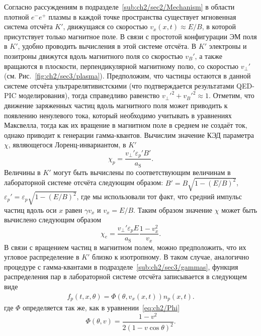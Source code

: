 Согласно рассуждениям в подразделе~\ref{sub:ch2/sec2/Mechanism} в области плотной $e^-e^+$ плазмы в каждой точке пространства существует мгновенная система отсчёта $K'$, движущаяся со скоростью $v_x(x,t)\approx E/B$, в которой присутствует только магнитное поле.
В связи с простотой конфигурации ЭМ поля в $K'$, удобно проводить вычисления в этой системе отсчёта.
В $K'$ электроны и позитроны движутся вдоль магнитного поля со скоростью $v_B'$, а также вращаются в плоскости, перпендикулярной магнитному полю, со скоростью $v_\perp'$ (см. Рис.~\ref{fig:ch2/sec3/plasma}). 
Предположим, что частицы остаются в данной системе отсчёта ультрарелятивистскими (что подтверждается результатами QED-PIC моделирования), тогда справедливо равенство ${v_\perp'}^2+{v_B'}^2\approx1$.
Отметим, что движение заряженных частиц вдоль магнитного поля может приводить к появлению ненулевого тока, который необходимо учитывать в уравнениях Максвелла, тогда как их вращение в магнитном поле в среднем не создаёт ток, однако приводит к генерации гамма-квантов.
Вычислим значение КЭД параметра $\chi$, являющегося Лоренц-инвариантом, в $K'$
\begin{equation}
    \chi_p=\frac{v_\perp'\varepsilon_p'B'}{a_\mathrm{S}} .
\end{equation}
Величины в $K'$ могут быть вычислены по соответствующим величинам в лабораторной системе отсчёта следующим образом: $B'=B\sqrt{1-(E/B)^2}$, $\varepsilon_p'=\varepsilon_p\sqrt{1-(E/B)^2}$, где мы использовали тот факт, что средний импульс частиц вдоль оси $x$ равен $\gamma v_x$ и $v_x=E/B$.
Таким образом значение $\chi$ может быть вычислено следующим образом
\begin{equation}
    \label{eq:ch2/chip}
    \chi_e = \frac{v_\perp'\varepsilon_p E}{a_\mathrm{S}} \frac{1-v_x^2}{v_x} .
\end{equation}
В связи с вращением частиц в магнитном полем, можно предположить, что их угловое распределение в $K'$ близко к изотропному.
В таком случае, аналогично процедуре с гамма-квантами в подразделе~\ref{sub:ch2/sec3/gammas}, функция распределения пар в лабораторной системе отсчёта записывается в следующем виде
\begin{align}
    \label{eq:ch2/distr}
    f_p(t,x,\theta)=\Phi\left(\theta, v_x(x,t)\right) n_p(x,t) .
\end{align}
где $\Phi$ определяется так же, как в уравнении~\eqref{eq:ch2/Phi}
\begin{equation}
    \Phi(\theta,v) = \frac{1-v^2}{{2\left( 1 - v \cos{\theta}  \right)}^2} . \nonumber
\end{equation}
